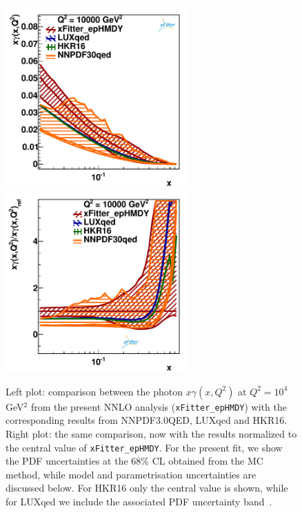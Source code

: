 \begin{figure}[t]
  \includegraphics[width=7cm]{figs/photon_comp_10000.pdf}
  \includegraphics[width=7cm]{figs/photon_comp_10000_ratio.pdf} 
  \caption{Left plot: comparison between the photon $x\gamma(x,Q^2)$ at $Q^2=10^4$ GeV$^2$
    from the present NNLO analysis ({\tt xFitter\_epHMDY}) with the
    corresponding results from NNPDF3.0QED, LUXqed and HKR16.
  Right plot: the same comparison, now with the results normalized to the central value
  of {\tt xFitter\_epHMDY}.
  For the present fit, we show the PDF uncertainties at the 68\% CL obtained from the MC method,
  while model and parametrisation uncertainties are discussed below.
  For HKR16 only the central value is shown, while for LUXqed we include
  the associated PDF uncertainty band~\cite{Manohar:2016nzj}. }
\label{photon_zoom} \label{photon_zoom_ratio}
\end{figure}

